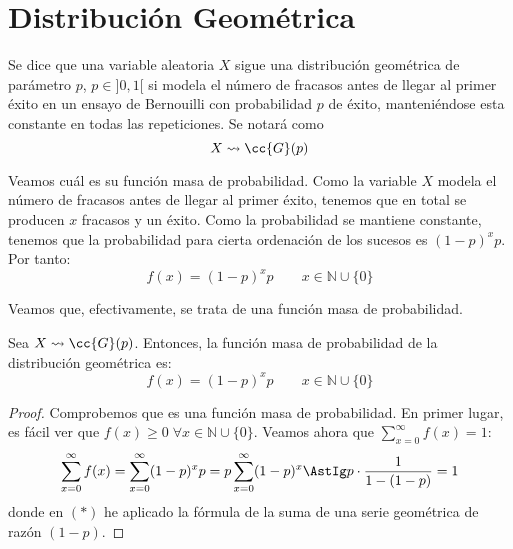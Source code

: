 \section{Distribución Geométrica}

\begin{definicion}
    Se dice que una variable aleatoria $X$ sigue una distribución geométrica de parámetro $p$, $p\in ]0,1[$ si modela el número de fracasos antes de llegar al primer éxito en un ensayo de Bernouilli con probabilidad $p$ de éxito, manteniéndose esta constante en todas las repeticiones. Se notará como $$X\leadsto \cc{G}(p)$$
\end{definicion}

Veamos cuál es su función masa de probabilidad. Como la variable $X$ modela el número de fracasos antes de llegar al primer éxito, tenemos que en total se producen $x$ fracasos y un éxito. Como la probabilidad se mantiene constante, tenemos que la probabilidad para cierta ordenación de los sucesos es $(1-p)^{x}p$. Por tanto:
\begin{equation*}
    f(x) = (1-p)^{x}p \qquad x\in \mathbb{N}\cup \{0\}
\end{equation*}

Veamos que, efectivamente, se trata de una función masa de probabilidad.
\begin{prop}
    Sea $X\leadsto \cc{G}(p)$. Entonces, la función masa de probabilidad de la distribución geométrica es:
    \begin{equation*}
        f(x) = (1-p)^{x}p \qquad x\in \mathbb{N}\cup \{0\}
    \end{equation*}
\end{prop}
\begin{proof}
    Comprobemos que es una función masa de probabilidad. En primer lugar, es fácil ver que $f(x)\geq 0\;\forall x\in \mathbb{N}\cup \{0\}$. Veamos ahora que $\sum\limits_{x=0}^\infty f(x)=1$:
    \begin{equation*}
        \sum_{x=0}^\infty f(x)
        = \sum_{x=0}^\infty (1-p)^{x}p
        = p\sum_{x=0}^\infty (1-p)^{x}
        \AstIg p\cdot \frac{1}{1-(1-p)} = 1
    \end{equation*}
    donde en $(\ast)$ he aplicado la fórmula de la suma de una serie geométrica de razón $(1-p)$.
\end{proof}


